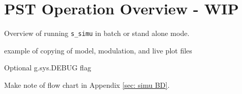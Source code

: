 \chapter{PST Operation Overview - WIP}

Overview of running \verb|s_simu| in batch or stand alone mode.

example of copying of model, modulation, and live plot files

Optional g.sys.DEBUG flag

Make note of flow chart in Appendix \ref{sec: simu BD}.
